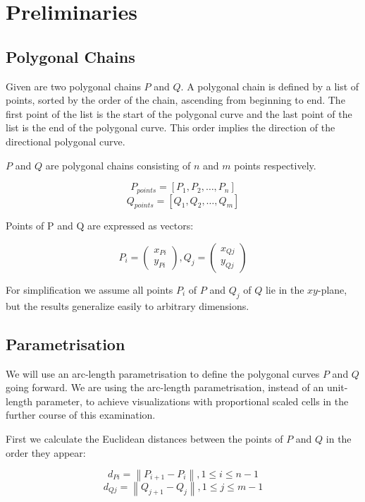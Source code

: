 \section{Preliminaries}
\subsection{Polygonal Chains}

Given are two polygonal chains $P$ and $Q$. A polygonal chain is defined by a list of points, sorted by the order of the chain, ascending from beginning to end. The first point of the list is the start of the polygonal curve and the last point of the list is the end of the polygonal curve. This order implies the direction of the directional polygonal curve.

$P$ and $Q$ are polygonal chains consisting of $n$ and $m$ points respectively.

$$P_{points} = [P_1, P_2, …, P_n]$$
$$Q_{points} = [Q_1, Q_2, …, Q_m]$$

Points of P and Q are expressed as vectors:

$$P_{i} = \begin{pmatrix}x_{Pi} \\ y_{Pi}\end{pmatrix}, Q_{j} = \begin{pmatrix}x_{Qj} \\ y_{Qj}\end{pmatrix}$$

For simplification we assume all points $P_{i}$ of $P$ and $Q_{j}$ of $Q$ lie in the $xy$-plane, but the results generalize easily to arbitrary dimensions\cite{rotelex}.

\subsection{Parametrisation}

We will use an arc-length parametrisation to define the polygonal curves $P$ and $Q$ going forward. We are using the arc-length parametrisation, instead of an unit-length parameter, to achieve visualizations with proportional scaled cells in the further course of this examination.

First we calculate the Euclidean distances between the points of $P$ and $Q$ in the order they appear:

$$d_{Pi} = \left\|P_{i+1} - P_{i}\right\|, 1 \leq i \leq n-1$$
$$d_{Qj} = \left\|Q_{j+1} - Q_{j}\right\|, 1 \leq j \leq m-1$$

